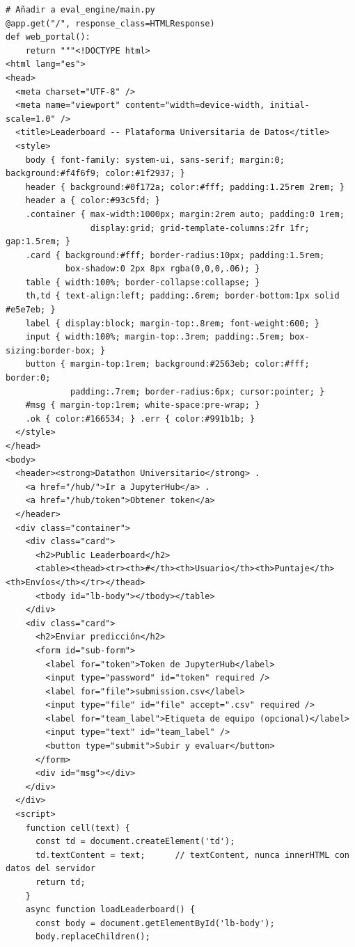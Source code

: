 \documentclass[11pt,a4paper]{article}
\begin{document}
\begin{lstlisting}
# Añadir a eval_engine/main.py
@app.get("/", response_class=HTMLResponse)
def web_portal():
    return """<!DOCTYPE html>
<html lang="es">
<head>
  <meta charset="UTF-8" />
  <meta name="viewport" content="width=device-width, initial-scale=1.0" />
  <title>Leaderboard -- Plataforma Universitaria de Datos</title>
  <style>
    body { font-family: system-ui, sans-serif; margin:0; background:#f4f6f9; color:#1f2937; }
    header { background:#0f172a; color:#fff; padding:1.25rem 2rem; }
    header a { color:#93c5fd; }
    .container { max-width:1000px; margin:2rem auto; padding:0 1rem;
                 display:grid; grid-template-columns:2fr 1fr; gap:1.5rem; }
    .card { background:#fff; border-radius:10px; padding:1.5rem;
            box-shadow:0 2px 8px rgba(0,0,0,.06); }
    table { width:100%; border-collapse:collapse; }
    th,td { text-align:left; padding:.6rem; border-bottom:1px solid #e5e7eb; }
    label { display:block; margin-top:.8rem; font-weight:600; }
    input { width:100%; margin-top:.3rem; padding:.5rem; box-sizing:border-box; }
    button { margin-top:1rem; background:#2563eb; color:#fff; border:0;
             padding:.7rem; border-radius:6px; cursor:pointer; }
    #msg { margin-top:1rem; white-space:pre-wrap; }
    .ok { color:#166534; } .err { color:#991b1b; }
  </style>
</head>
<body>
  <header><strong>Datathon Universitario</strong> .
    <a href="/hub/">Ir a JupyterHub</a> .
    <a href="/hub/token">Obtener token</a>
  </header>
  <div class="container">
    <div class="card">
      <h2>Public Leaderboard</h2>
      <table><thead><tr><th>#</th><th>Usuario</th><th>Puntaje</th><th>Envíos</th></tr></thead>
      <tbody id="lb-body"></tbody></table>
    </div>
    <div class="card">
      <h2>Enviar predicción</h2>
      <form id="sub-form">
        <label for="token">Token de JupyterHub</label>
        <input type="password" id="token" required />
        <label for="file">submission.csv</label>
        <input type="file" id="file" accept=".csv" required />
        <label for="team_label">Etiqueta de equipo (opcional)</label>
        <input type="text" id="team_label" />
        <button type="submit">Subir y evaluar</button>
      </form>
      <div id="msg"></div>
    </div>
  </div>
  <script>
    function cell(text) {
      const td = document.createElement('td');
      td.textContent = text;      // textContent, nunca innerHTML con datos del servidor
      return td;
    }
    async function loadLeaderboard() {
      const body = document.getElementById('lb-body');
      body.replaceChildren();

\end{lstlisting}
\end{document}
